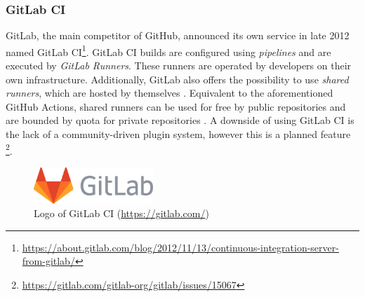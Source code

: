 
\subsubsection{GitLab CI}
GitLab, the main competitor of GitHub, announced its own \CI{} service in late 2012 named GitLab CI\footnote{\url{https://about.gitlab.com/blog/2012/11/13/continuous-integration-server-from-gitlab/}}. GitLab CI builds are configured using \emph{pipelines} and are executed by \emph{GitLab Runners}. These runners are operated by developers on their own infrastructure. Additionally, GitLab also offers the possibility to use \emph{shared runners}, which are hosted by themselves \cite{ciusinggitlab}. Equivalent to the aforementioned GitHub Actions, shared runners can be used for free by public repositories and are bounded by quota for private repositories \cite{gitlabdocs}. A downside of using GitLab CI is the lack of a community-driven plugin system, however this is a planned feature \footnote{\url{https://gitlab.com/gitlab-org/gitlab/issues/15067}}.

\begin{figure}[htbp!]
	\centering
	\includegraphics[width=0.40\textwidth]{assets/images/gitlab.pdf}
	\caption{Logo of GitLab CI (\url{https://gitlab.com/})}
	\label{fig:gitlab-ci}
\end{figure}